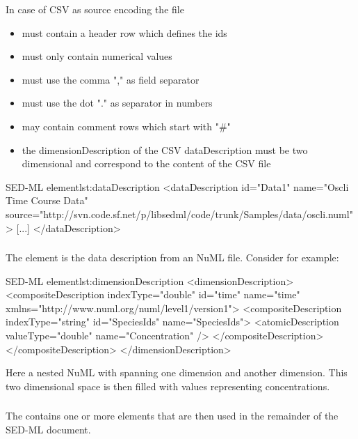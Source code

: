 In case of CSV as source encoding the file
\begin{itemize}
	\item must contain a header row which defines the ids
	\item must only contain numerical values 
	\item must use the comma "," as field separator
	\item must use the dot "." as separator in numbers
	\item may contain comment rows which start with "\#"
	\item the dimensionDescription of the CSV dataDescription must be two dimensional and correspond to the content of the CSV file 
\end{itemize}

\begin{myXmlLst}{SED-ML  element}{lst:dataDescription}
<dataDescription id="Data1" name="Oscli Time Course Data" 
	source="http://svn.code.sf.net/p/libsedml/code/trunk/Samples/data/oscli.numl" >
    [...]
</dataDescription>
\end{myXmlLst} 


\subsubsection{}
\label{sec:dimensionDescription}
The  element is the data description from an NuML file. Consider for example:

\begin{myXmlLst}{SED-ML  element}{lst:dimensionDescription}
<dimensionDescription>
	<compositeDescription indexType="double" id="time" name="time" 
		xmlns="http://www.numl.org/numl/level1/version1">
		<compositeDescription indexType="string" id="SpeciesIds" name="SpeciesIds">
			<atomicDescription valueType="double" name="Concentration" />
		</compositeDescription>
	</compositeDescription>
</dimensionDescription>
\end{myXmlLst} 

Here a nested NuML  with  spanning one dimension and  another dimension. This two dimensional space is then filled with  values representing concentrations.


\subsubsection{}
\label{sec:listOfDataSources}
The  contains one or more \SedDataSource elements that are then used in the remainder of the SED-ML document.


